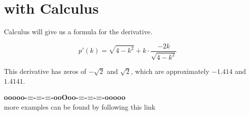 \documentclass{ximera}
\begin{document}
\section*{with Calculus}


Calculus will give us a formula for the derivative.

\[    p'(k) = \sqrt{4 - k^2} + k \cdot \frac{-2k}{\sqrt{4-k^2}}  \]


This derivative has zeros of $-\sqrt{2}$ and $\sqrt{2}$, which are approximately $-1.414$ and $1.4141$. 












\begin{center}
\textbf{\textcolor{green!50!black}{ooooo-=-=-=-ooOoo-=-=-=-ooooo}} \\

more examples can be found by following this link\\ 

\end{center}
\end{document}
